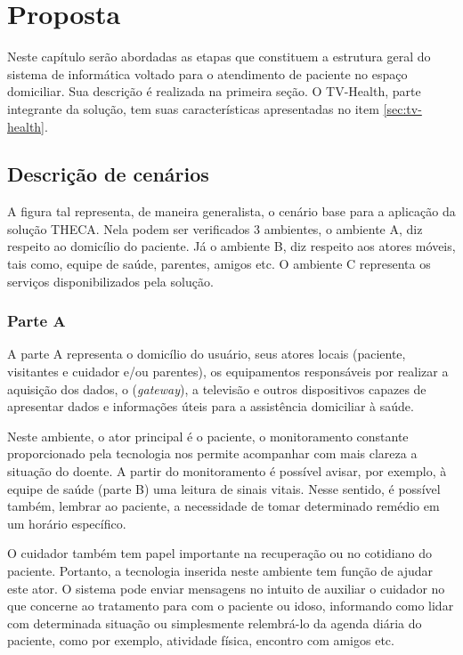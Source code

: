 \chapter{Proposta}\label{cap:proposta}

Neste capítulo serão abordadas as etapas que constituem a estrutura geral do
sistema de informática voltado para o atendimento de paciente no espaço domiciliar. 
Sua descrição é realizada na primeira seção. O TV-Health, parte integrante da 
solução, tem suas características apresentadas no item \ref{sec:tv-health}.

\section{Descrição de cenários}

A figura tal representa, de maneira generalista, o cenário base para a aplicação
da solução THECA. Nela podem ser verificados 3 ambientes, o ambiente A, diz
respeito ao domicílio do paciente. Já o ambiente B, diz respeito aos atores
móveis, tais como, equipe de saúde, parentes, amigos etc. O ambiente C
representa os serviços disponibilizados pela solução.


\subsection{Parte A} \label{subsec:parte-a}

A parte A representa o domicílio do usuário, seus atores locais (paciente,
visitantes e cuidador e/ou parentes), os equipamentos responsáveis por  realizar
a aquisição dos dados, o \stb[] (\textit{gateway}), a televisão e outros
dispositivos capazes de apresentar dados e informações úteis para a assistência
domiciliar à saúde.

Neste ambiente, o ator principal é o paciente, o monitoramento constante 
proporcionado pela tecnologia nos permite acompanhar com mais clareza a situação
do doente. A partir do monitoramento é possível avisar, por exemplo, à equipe
de saúde (parte B) uma leitura de sinais vitais. Nesse sentido, é possível 
também, lembrar ao paciente, a necessidade de tomar determinado remédio em um
horário específico.

O cuidador também tem papel importante na recuperação ou no cotidiano do 
paciente. Portanto, a tecnologia inserida neste ambiente tem função de ajudar
este ator. O sistema pode enviar mensagens no intuito de auxiliar o cuidador no
que concerne ao tratamento para com o paciente ou idoso, informando como lidar
com determinada situação ou simplesmente relembrá-lo da agenda diária do 
paciente, como por exemplo, atividade física, encontro com amigos etc.

